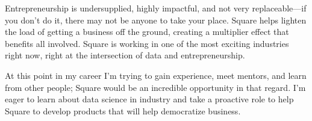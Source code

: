 \documentclass[11pt, a4paper]{awesome-cv} %
\begin{document}
\begin{cvletter}


Entrepreneurship is undersupplied, highly impactful, and not very replaceable---if you don't do it, there may not be anyone to take your place. Square helps lighten the load of getting a business off the ground, creating a multiplier effect that benefits all involved. Square is working in one of the most exciting industries right now, right at the intersection of data and entrepreneurship.

At this point in my career I’m trying to gain experience, meet mentors, and learn from other people; Square would be an incredible opportunity in that regard. I’m eager to learn about data science in industry and take a proactive role to help Square to develop products that will help democratize business. 





\end{cvletter}


\makeletterclosing %
\end{document}
